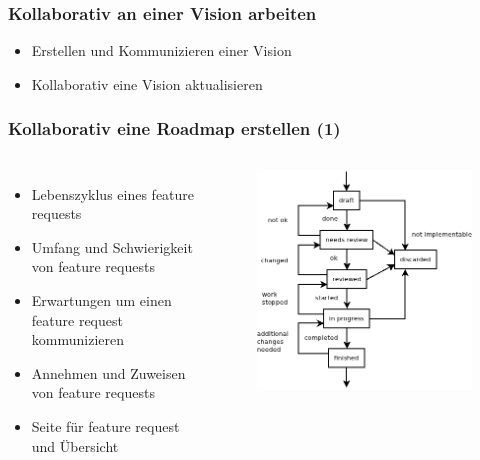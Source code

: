 \documentclass{beamer}
\begin{document}
\begin{frame}
\frametitle{Kollaborativ an einer Vision arbeiten}
\begin{itemize}
 \item Erstellen und Kommunizieren einer Vision
 \item Kollaborativ eine Vision aktualisieren
\end{itemize}
\end{frame}

\begin{frame}
\frametitle{Kollaborativ eine Roadmap erstellen (1)}
\begin{columns}
  \begin{itemize}
   \item Lebenszyklus eines feature requests
   \item Umfang und Schwierigkeit von feature requests
   \item Erwartungen um einen feature request kommunizieren
   \item Annehmen und Zuweisen von feature requests
   \item Seite f\"ur feature request und \"Ubersicht
  \end{itemize}
  \begin{figure}[h!]
   \centering
   \includegraphics[scale=0.4,keepaspectratio=true]{./featurerequeststates.png}
  \end{figure}
\end{columns}
\end{frame}
\end{document}

